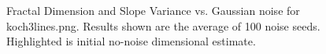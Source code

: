 \documentclass[12pt, oneside]{book}
\begin{document}
\begin{figure}[!b]
  \centering
  \caption[Fractal Dimension and Slope Variance vs. Gaussian noise for koch3lines.png.]{Fractal Dimension and Slope Variance vs. Gaussian noise for koch3lines.png.  Results shown are the average of 100 noise seeds.  Highlighted is initial no-noise dimensional estimate.}
  \label{fig:koch3lines_gaussian_result}
\end{figure}
\end{document}
